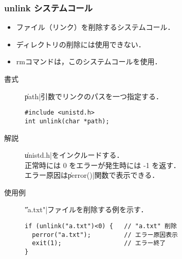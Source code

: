 \documentclass{beamer}                 %
\begin{document}
\begin{frame}[fragile]
  \frametitle{unlink システムコール}
  \begin{itemize}
    \item ファイル（リンク）を削除するシステムコール．
    \item ディレクトリの削除には使用できない．
    \item rmコマンドは，このシステムコールを使用．
  \end{itemize}

\begin{description}
\item[書式] \|path|引数でリンクのパスを一つ指定する．

\begin{verbatim}
#include <unistd.h>
int unlink(char *path);
\end{verbatim}

\item[解説] \|unistd.h|をインクルードする．\\
正常時には 0 をエラーが発生時には -1 を返す．\\
エラー原因は\|perror()|関数で表示できる．

\item[使用例] \|"a.txt"|ファイルを削除する例を示す．

\begin{verbatim}
if (unlink("a.txt")<0) {   // "a.txt" 削除
  perror("a.txt");         // エラー原因表示
  exit(1);                 // エラー終了
}
\end{verbatim}

  \end{description}
\end{frame}
\end{document}
